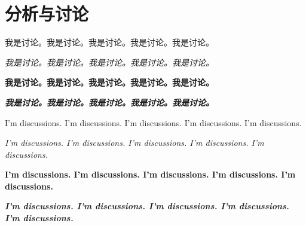 \chapter{分析与讨论}

我是讨论。我是讨论。我是讨论。我是讨论。我是讨论。

\textit{我是讨论。我是讨论。我是讨论。我是讨论。我是讨论。}

\textbf{我是讨论。我是讨论。我是讨论。我是讨论。我是讨论。}

\textbf{\textit{我是讨论。我是讨论。我是讨论。我是讨论。我是讨论。}}

I'm discussions. I'm discussions. I'm discussions. I'm discussions. I'm discussions. 

\textit{I'm discussions. I'm discussions. I'm discussions. I'm discussions. I'm discussions.}

\textbf{I'm discussions. I'm discussions. I'm discussions. I'm discussions. I'm discussions.}

\textbf{\textit{I'm discussions. I'm discussions. I'm discussions. I'm discussions. I'm discussions.}}

\clearpage